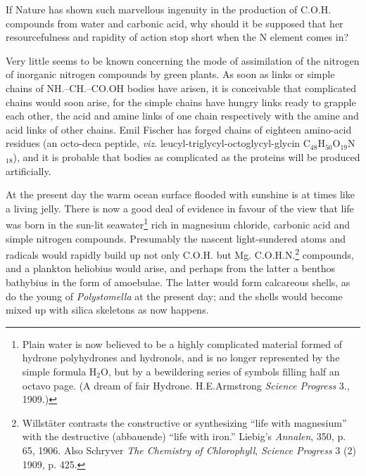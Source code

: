 \documentclass[a4paper, 12pt, oneside]{article}
\begin{document}
If Nature has shown such marvellous ingenuity in the production of C.O.H. compounds from water and carbonic acid, why should it be supposed that her resourcefulness and rapidity of action stop short when the N element comes in?

Very little seems to be known concerning the mode of assimilation of the nitrogen of inorganic nitrogen compounds by green plants. As soon as links or simple chains of NH.--CH.--CO.OH bodies have arisen, it is conceivable that complicated chains would soon arise, for the simple chains have hungry links ready to grapple each other, the acid and amine links of one chain respectively with the amine and acid links of other chains. Emil Fischer has forged chains of eighteen amino-acid residues (an octo-deca peptide, \emph{viz.} leucyl-triglycyl-octoglycyl-glycin C$_{48}$H$_{50}$O$_{19}$N$_{18}$), and it is probable that bodies as complicated as the proteins will be produced artificially.

At the present day the warm ocean surface flooded with sunshine is at times like a living jelly. There is now a good deal of evidence in favour of the view that life was born in the sun-lit seawater\footnote{Plain water is now believed to be a highly complicated material formed of hydrone polyhydrones and hydronols, and is no longer represented by the simple formula H$_{2}$O, but by a bewildering series of symbols filling half an octavo page. (A dream of fair Hydrone. H.E.Armstrong \emph{Science Progress} 3., 1909.)} rich in magnesium chloride, carbonic acid and simple nitrogen compounds. Presumably the nascent light-sundered atoms and radicals would rapidly build up not only C.O.H. but Mg. C.O.H.N.\footnote{Willstäter contrasts the constructive or synthesizing ``life with magnesium'' with the destructive (abbauende) ``life with iron.'' Liebig's \emph{Annalen}, 350, p. 65, 1906. Also Schryver \emph{The Chemistry of Chlorophyll}, \emph{Science Progress} 3 (2) 1909, p. 425.} compounds, and a plankton heliobius would arise, and perhaps from the latter a benthos bathybius in the form of amoebulae. The latter would form calcareous shells, as do the young of \emph{Polystomella} at the present day; and the shells would become mixed up with silica skeletons as now happens.
\end{document}
